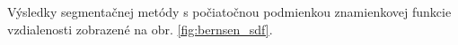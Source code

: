 \documentclass[a4paper,11pt,oneside]{article}%
\begin{document}
Výsledky segmentačnej metódy s počiatočnou podmienkou znamienkovej funkcie vzdialenosti zobrazené na obr. \ref{fig:bernsen_sdf}.


\begin{figure}[H]  
    \hspace{5px}

\end{figure}
\end{document}
